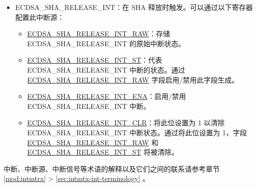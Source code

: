 \documentclass[main\_\_CN.tex]{subfiles}
\begin{document}
\begin{itemize}
	      \begin{itemize}
		      \item \hyperref[fielddesc:ECDSAPOSTDONEINTRAW]{ECDSA\_POST\_DONE\_INT\_RAW}：存储 ECDSA\_POST\_DONE\_INT 的原始中断状态。
		      \item \hyperref[fielddesc:ECDSAPOSTDONEINTST]{ECDSA\_POST\_DONE\_INT\_ST}：代表 ECDSA\_POST\_DONE\_INT 中断的状态。通过 \hyperref[fielddesc:ECDSAPOSTDONEINTRAW]{ECDSA\_POST\_DONE\_INT\_RAW} 字段启用/禁用此字段生成。
		      \item \hyperref[fielddesc:ECDSAPOSTDONEINTENA]{ECDSA\_POST\_DONE\_INT\_ENA}：启用/禁用 ECDSA\_POST\_DONE\_INT 中断。
		      \item \hyperref[fielddesc:ECDSAPOSTDONEINTCLR]{ECDSA\_POST\_DONE\_INT\_CLR}：将此位设置为 1 以清除 ECDSA\_POST\_DONE\_INT 中断状态。通过将此位设置为 1，字段 \hyperref[fielddesc:ECDSAPOSTDONEINTRAW]{ECDSA\_POST\_DONE\_INT\_RAW} 和 \hyperref[fielddesc:ECDSAPOSTDONEINTST]{ECDSA\_POST\_DONE\_INT\_ST} 将被清除。
	      \end{itemize}
	\item \label{int:ECDSASHARELEASEINT}ECDSA\_SHA\_RELEASE\_INT：在 SHA 释放时触发。可以通过以下寄存器配置此中断源：
	      \begin{itemize}
		      \item \hyperref[fielddesc:ECDSASHARELEASEINTRAW]{ECDSA\_SHA\_RELEASE\_INT\_RAW}：存储 ECDSA\_SHA\_RELEASE\_INT 的原始中断状态。
		      \item \hyperref[fielddesc:ECDSASHARELEASEINTST]{ECDSA\_SHA\_RELEASE\_INT\_ST}：代表 ECDSA\_SHA\_RELEASE\_INT 中断的状态。通过 \hyperref[fielddesc:ECDSASHARELEASEINTRAW]{ECDSA\_SHA\_RELEASE\_INT\_RAW} 字段启用/禁用此字段生成。
		      \item \hyperref[fielddesc:ECDSASHARELEASEINTENA]{ECDSA\_SHA\_RELEASE\_INT\_ENA}：启用/禁用 ECDSA\_SHA\_RELEASE\_INT 中断。
		      \item \hyperref[fielddesc:ECDSASHARELEASEINTCLR]{ECDSA\_SHA\_RELEASE\_INT\_CLR}：将此位设置为 1 以清除 ECDSA\_SHA\_RELEASE\_INT 中断状态。通过将此位设置为 1，字段 \hyperref[fielddesc:ECDSASHARELEASEINTRAW]{ECDSA\_SHA\_RELEASE\_INT\_RAW} 和 \hyperref[fielddesc:ECDSASHARELEASEINTST]{ECDSA\_SHA\_RELEASE\_INT\_ST} 将被清除。
	      \end{itemize}
\end{itemize}

\begin{tiplisting}
中断、中断源、中断信号等术语的解释以及它们之间的联系请参考章节 \ref{mod:intmtrx} \textit{} > \ref{sec:intmtx-int-terminology} \textit{}。
\end{tiplisting}
\end{document}
